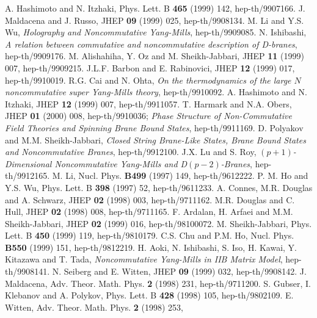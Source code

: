 \documentclass[a4paper,12pt]{article}
\begin{document}
\newpage
\begin{thebibliography}{99}
A. Hashimoto and N. Itzhaki, Phys. Lett. B {\bf 465}
  (1999) 142, hep-th/9907166.
J. Maldacena and J. Russo, JHEP {\bf 09} (1999) 025,
  hep-th/9908134.
M. Li and Y.S. Wu, {\it Holography and
  Noncommutative Yang-Mills}, hep-th/9909085.
N. Ishibashi, {\it A relation between commutative and
  noncommutative description of D-branes}, hep-th/9909176.
M. Alishahiha, Y. Oz and M. Sheikh-Jabbari, JHEP {\bf 11}
  (1999) 007, hep-th/9909215.
J.L.F. Barbon and E. Rabinovici, JHEP {\bf 12} (1999) 017,
  hep-th/9910019.
R.G. Cai and N. Ohta, {\it On the thermodynamics of the
  large $N$ noncommutative super Yang-Mills theory}, hep-th/9910092.
A. Hashimoto and N. Itzhaki, JHEP {\bf 12} (1999) 007,
  hep-th/9911057.
 T. Harmark and N.A. Obers, JHEP {\bf 01} (2000) 008,
  hep-th/9910036; {\it Phase Structure of Non-Commutative Field Theories
  and Spinning Brane Bound States}, hep-th/9911169.
D. Polyakov and M.M. Sheikh-Jabbari, {\it Closed String
  Brane-Like States, Brane Bound States and Noncommutative Branes},
  hep-th/9912100.
J.X. Lu and S. Roy, {\it $(p+1)$-Dimensional Noncommutative
  Yang-Mills and D$(p-2)$-Branes}, hep-th/9912165.
 M. Li, Nucl. Phys. {\bf B499} (1997) 149, hep-th/9612222.
 P. M. Ho and Y.S. Wu, Phys. Lett. B {\bf 398} (1997) 52,
  hep-th/9611233.
 A. Connes, M.R. Douglas and A. Schwarz, JHEP {\bf 02}
  (1998) 003, hep-th/9711162.
 M.R. Douglas and C. Hull, JHEP {\bf 02} (1998) 008,
  hep-th/9711165.
 F. Ardalan, H. Arfaei and M.M. Sheikh-Jabbari, JHEP
  {\bf 02} (1999) 016, hep-th/98100072.
 M. Sheikh-Jabbari, Phys. Lett. B {\bf 450} (1999) 119,
  hep-th/9810179.
C.S. Chu and P.M. Ho, Nucl. Phys. {\bf B550} (1999) 151,
  hep-th/9812219.
 H. Aoki, N. Ishibashi, S. Iso, H. Kawai, Y. Kitazawa and
  T. Tada, {\it Noncommutative Yang-Mills in IIB Matrix Model}, hep-th/9908141.
N. Seiberg and E. Witten, JHEP {\bf 09} (1999) 032,
  hep-th/9908142.
J. Maldacena, Adv. Theor. Math. Phys. {\bf 2} (1998) 231,
  hep-th/9711200.
S. Gubser, I. Klebanov and A. Polykov, Phys. Lett. B
  {\bf 428} (1998) 105, hep-th/9802109.
E. Witten, Adv. Theor. Math. Phys. {\bf 2} (1998) 253,

\end{thebibliography}
\end{document}
